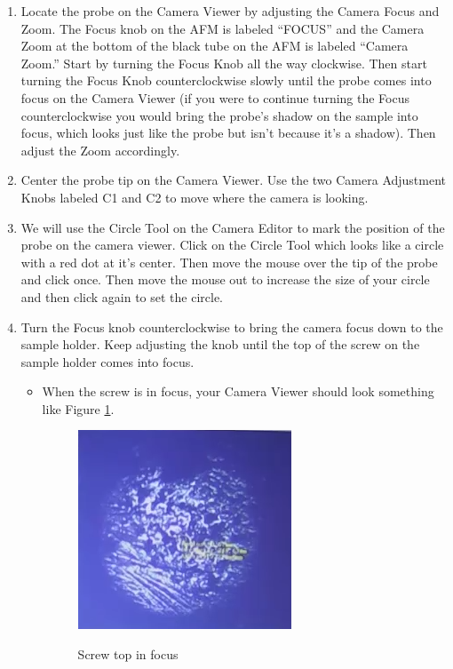 \documentclass{../lab}
\begin{document}
\begin{enumerate}
    \item Locate the probe on the Camera Viewer by adjusting the Camera Focus and Zoom.  The Focus knob on the AFM is labeled ``FOCUS'' and the Camera Zoom at the bottom of the black tube on the AFM is labeled ``Camera Zoom.''  Start by turning the Focus Knob all the way clockwise.  Then start turning the Focus Knob counterclockwise slowly until the probe comes into focus on the Camera Viewer (if you were to continue turning the Focus counterclockwise you would bring the probe's shadow on the sample into focus, which looks just like the probe but isn't because it's a shadow).  Then adjust the Zoom accordingly.

    \item Center the probe tip on the Camera Viewer.  Use the two Camera Adjustment Knobs labeled C1 and C2 to move where the camera is looking.
    
    \item We will use the Circle Tool on the Camera Editor to mark the position of the probe on the camera viewer. Click on the Circle Tool which looks like a circle with a red dot at it's center. Then move the mouse over the tip of the probe and click once.  Then move the mouse out to increase the size of your circle and then click again to set the circle.
    
    \item Turn the Focus knob counterclockwise to bring the camera focus down to the sample holder.  Keep adjusting the knob until the top of the screw on the sample holder comes into focus.
    \begin{itemize}
        \item When the screw is in focus, your Camera Viewer should look something like Figure \ref{fig:ScrewTop}.
        
        \begin{figure}[h]
        \centering
            \href{http://experimentationlab.berkeley.edu/sites/default/files/AFMImages/sampleholder.PNG}{\includegraphics[width=0.5\linewidth]{images/sampleholder.PNG}}
            \caption{Screw top in focus}
            \label{fig:ScrewTop}
        \end{figure}
        

\end{itemize}
\end{enumerate}
\end{document}
